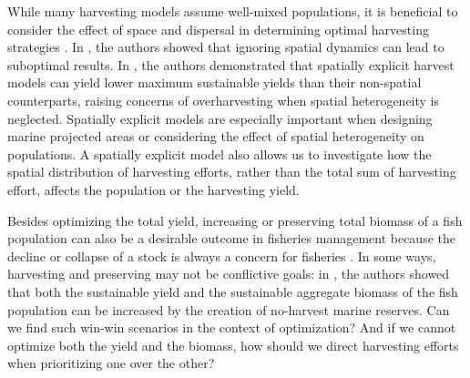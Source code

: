 \documentclass[11pt]{article}
\theoremstyle{definition}
\begin{document}
While many harvesting models assume well-mixed populations, it is beneficial to consider the effect of space and dispersal in determining optimal harvesting strategies \cite{ding2009optimal, gonzalez2011two, herrera2010spatial, kelly2016optimal, supriatna1999harvesting, takashina2015maximum, tuck2000marine}. In \cite{herrera2010spatial}, the authors showed that ignoring spatial dynamics can lead to suboptimal results. In \cite{takashina2015maximum}, the authors demonstrated that spatially explicit harvest models can yield  lower maximum sustainable yields than their non-spatial counterparts, raising concerns of overharvesting when spatial heterogeneity is neglected. Spatially explicit models are especially important when designing marine projected areas \cite{gaines2010designing, gonzalez2011two, kelly2016optimal, moeller2015economically, neubert2003marine, moeller2015economically} or considering the effect of spatial heterogeneity \cite{kelly2016optimal} on populations. A spatially explicit model also allows us to investigate how the spatial distribution of harvesting efforts, rather than the total sum of harvesting effort, affects the population or the harvesting yield.

Besides optimizing the total yield, increasing or preserving total biomass of a fish population can also be a desirable outcome in fisheries management \cite{jensen2002maximum} because the decline or collapse of a stock is always a concern for fisheries \cite{lauck1998implementing}. In some ways, harvesting and preserving may not be conflictive goals: in \cite{sanchirico2001bioeconomic}, the authors showed that both the sustainable yield and the sustainable aggregate biomass of the fish population can be increased by the creation of no-harvest marine reserves. Can we find such win-win scenarios in the context of optimization? And if we cannot optimize both the yield and the biomass, how should we direct harvesting efforts when prioritizing one over the other?  
\end{document}
